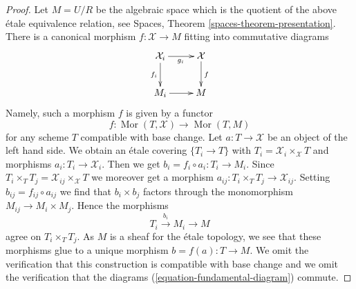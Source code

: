 \documentclass{stacks-project}
\theoremstyle{plain}
\theoremstyle{definition}
\theoremstyle{remark}
\numberwithin{equation}{subsection}
\def\Mor{\mathop{\mathrm{Mor}}\nolimits}
\begin{document}
\begin{proof}
\medskip\noindent
Let $M = U/R$ be the algebraic space which is the quotient of the above
\'etale equivalence relation, see
Spaces, Theorem \ref{spaces-theorem-presentation}.
There is a canonical morphism $f : \mathcal{X} \to M$
fitting into commutative diagrams
\begin{equation}
\label{equation-fundamental-diagram}
\xymatrix{
\mathcal{X}_i \ar[r]_{g_i} \ar[d]_{f_i} & \mathcal{X} \ar[d]^f \\
M_i \ar[r] & M
}
\end{equation}
Namely, such a morphism $f$ is given by a functor
$$
f : \Mor(T, \mathcal{X}) \longrightarrow \Mor(T, M)
$$
for any scheme $T$ compatible with base change. Let $a : T \to \mathcal{X}$
be an object of the left hand side. We obtain an \'etale covering
$\{T_i \to T\}$ with $T_i = \mathcal{X}_i \times_\mathcal{X} T$
and morphisms $a_i : T_i \to \mathcal{X}_i$. Then we get
$b_i = f_i \circ a_i : T_i \to M_i$. Since
$T_i \times_T T_j = \mathcal{X}_{ij} \times_\mathcal{X} T$
we moreover get a morphism $a_{ij} : T_i \times_T T_j \to \mathcal{X}_{ij}$.
Setting $b_{ij} = f_{ij} \circ a_{ij}$ we find that
$b_i \times b_j$ factors through the monomorphism
$M_{ij} \to M_i \times M_j$. Hence the morphisms
$$
T_i \xrightarrow{b_i} M_i \to M
$$
agree on $T_i \times_T T_j$. As $M$ is a sheaf for the \'etale
topology, we see that these morphisms glue to a unique
morphism $b = f(a) : T \to M$. We omit the verification that
this construction is compatible with base change and we omit
the verification that the diagrams
(\ref{equation-fundamental-diagram}) commute.


\end{proof}
\end{document}
